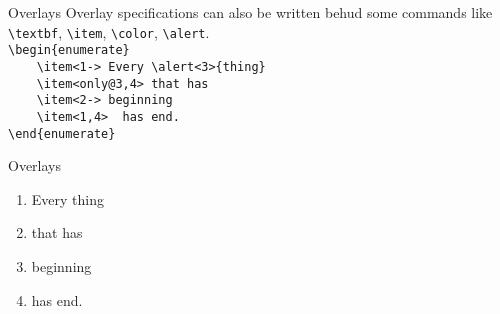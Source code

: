 \begin{frame}[fragile]{Overlays}
    Overlay specifications can also be written behud some commands like 
    \lstinline[basicstyle=\tt]|\textbf|,
    \lstinline[basicstyle=\tt]|\item|,
    \lstinline[basicstyle=\tt]|\color|,
    \lstinline[basicstyle=\tt]|\alert|. \\
    \pause
    \lstinline[basicstyle=\tt]|\begin{enumerate}| \\
    \lstinline[basicstyle=\tt]|    \item<1-> Every \alert<3>{thing}|   \\
    \lstinline[basicstyle=\tt]|    \item<only@3,4> that has|   \\
    \lstinline[basicstyle=\tt]|    \item<2-> beginning| \\
    \lstinline[basicstyle=\tt]|    \item<1,4>  has end.|   \\
    \lstinline[basicstyle=\tt]|\end{enumerate}|
\end{frame}

\begin{frame}{Overlays}
    \begin{enumerate}
        \item<1-> Every \alert<3>{thing}
        \item<only@3,4> that has
        \item<2-> beginning
        \item<1,4> has end.
    \end{enumerate}
\end{frame}

\cprotect{}

